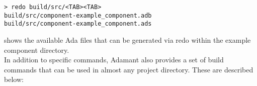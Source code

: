 \vspace{5mm} %
\begin{verbatim}
> redo build/src/<TAB><TAB>
build/src/component-example_component.adb
build/src/component-example_component.ads
\end{verbatim}
\vspace{5mm} %

shows the available Ada files that can be generated via redo within the example component directory. \\

In addition to specific commands, Adamant also provides a set of build commands that can be used in almost any project directory. These are described below:

\vspace{5mm} %
